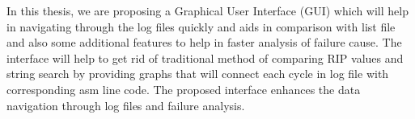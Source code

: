In this thesis, we are proposing a Graphical User Interface (GUI) which will help in navigating through the log files quickly and aids in comparison with list file and also some additional features to help in faster analysis of failure cause. The interface will help to get rid of traditional method of comparing RIP values and string search by providing graphs that will connect each cycle in log file with corresponding asm line code. The proposed interface enhances the data navigation through log files and failure analysis. 











